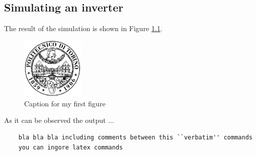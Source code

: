 

\chapter{}




\section{Simulating an inverter}



The result of the simulation is shown in Figure \ref{fig:cap1:iv}.


	\begin{figure}[h]
	\centering
	\includegraphics[width=3cm]{./logopoli}
	\caption{Caption for my first figure}
	\label{fig:cap1:iv}
	\end{figure}

As it can be observed the output ...

	\begin{verbatim}
	bla bla bla including comments between this ``verbatim'' commands
	you can ingore latex commands  	
	\end{verbatim}



